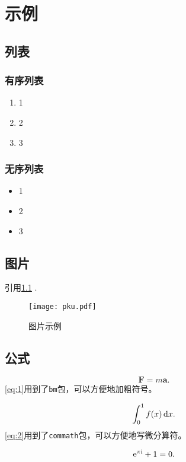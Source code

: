 \chapter{示例}

\thispagestyle{fancy}


\section{列表}

\subsection{有序列表}

\begin{enumerate}
    \item 1
    \item 2
    \item 3
\end{enumerate}

\subsection{无序列表}

\begin{itemize}
    \item 1
    \item 2
    \item 3
\end{itemize}

\section{图片}

引用\cref{fig:1} .

\begin{figure}[htp]
	\centering
	\texttt{[image: pku.pdf]}
	\caption{图片示例}
	\label{fig:1}
\end{figure}

\section{公式}


\begin{equation}
    \bm{F} = m\bm{a}.
    \label{eq:1}
\end{equation}
\cref{eq:1}用到了\texttt{bm}包，可以方便地加粗符号。

\begin{equation}
    \int^1_0 f(x) \dif x.
    \label{eq:2}
\end{equation}
\cref{eq:2}用到了\texttt{commath}包，可以方便地写微分算符。

\begin{equation}
    \mathrm{e} ^{\pi \mathrm{i}} + 1 = 0.
    \label{eq:3}
\end{equation}